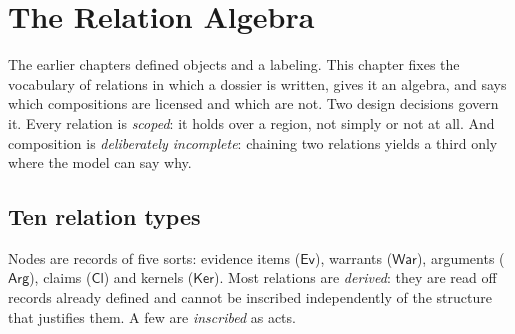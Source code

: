 \chapter{The Relation Algebra}\label{ch:relations}

The earlier chapters defined objects and a labeling. This chapter fixes the vocabulary of relations in which a dossier is written, gives it an algebra, and says which compositions are licensed and which are not. Two design decisions govern it. Every relation is \emph{scoped}: it holds over a region, not simply or not at all. And composition is \emph{deliberately incomplete}: chaining two relations yields a third only where the model can say why.

\section{Ten relation types}\label{sec:tenrel}

Nodes are records of five sorts: evidence items ($\mathsf{Ev}$), warrants ($\mathsf{War}$), arguments ($\mathsf{Arg}$), claims ($\mathsf{Cl}$) and kernels ($\mathsf{Ker}$). Most relations are \emph{derived}: they are read off records already defined and cannot be inscribed independently of the structure that justifies them. A few are \emph{inscribed} as acts.

